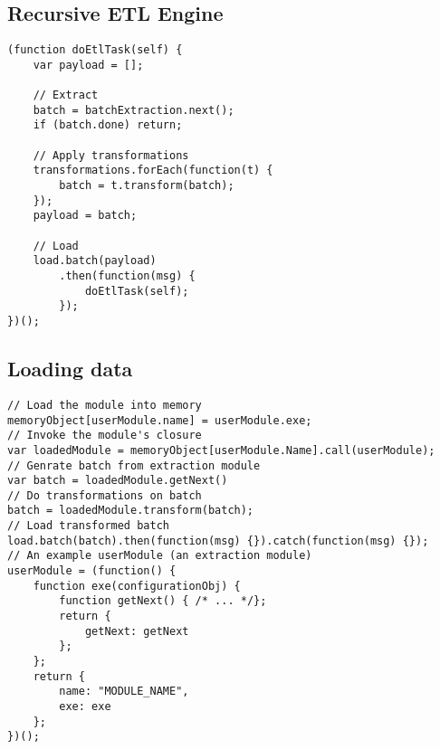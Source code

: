 \subsection{Recursive ETL Engine}
\label{appendix:netl-engine}
\begin{verbatim}
(function doEtlTask(self) {
    var payload = [];

    // Extract
    batch = batchExtraction.next();
    if (batch.done) return;

    // Apply transformations
    transformations.forEach(function(t) {
        batch = t.transform(batch);
    });
    payload = batch;

    // Load
    load.batch(payload)
        .then(function(msg) {
            doEtlTask(self);
        });
})();
\end{verbatim}

\subsection{Loading data}
\label{appendix:netl-loading}
\begin{verbatim}
// Load the module into memory
memoryObject[userModule.name] = userModule.exe;
// Invoke the module's closure
var loadedModule = memoryObject[userModule.Name].call(userModule);
// Genrate batch from extraction module
var batch = loadedModule.getNext()
// Do transformations on batch
batch = loadedModule.transform(batch);
// Load transformed batch
load.batch(batch).then(function(msg) {}).catch(function(msg) {});
// An example userModule (an extraction module)
userModule = (function() {
    function exe(configurationObj) {
        function getNext() { /* ... */};
        return {
            getNext: getNext
        };
    };
    return {
        name: "MODULE_NAME",
        exe: exe
    };
})();
\end{verbatim}